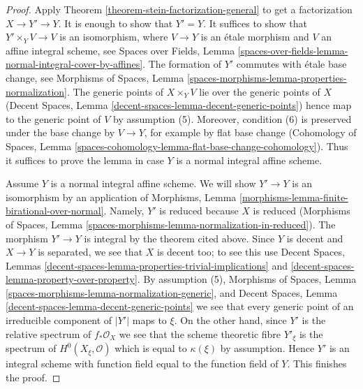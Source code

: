 \documentclass[10pt,a4paper]{amsart}
\theoremstyle{plain}
\theoremstyle{definition}
\theoremstyle{remark}
\numberwithin{equation}{subsection}
\begin{document}
\begin{proof}
Apply Theorem \ref{theorem-stein-factorization-general} to get a
factorization $X \to Y' \to Y$. It is enough to show that $Y' = Y$.
It suffices to show that $Y' \times_Y V \to V$ is an isomorphism,
where $V \to Y$ is an \'etale morphism and $V$ an affine integral scheme,
see Spaces over Fields, Lemma
\ref{spaces-over-fields-lemma-normal-integral-cover-by-affines}.
The formation of $Y'$ commutes with \'etale base change, see
Morphisms of Spaces, Lemma
\ref{spaces-morphisms-lemma-properties-normalization}.
The generic points of $X \times_Y V$ lie over the generic points of $X$
(Decent Spaces, Lemma \ref{decent-spaces-lemma-decent-generic-points})
hence map to the generic point of $V$ by assumption (5). Moreover, condition
(6) is preserved under the base change by $V \to Y$, for example by
flat base change (Cohomology of Spaces, Lemma
\ref{spaces-cohomology-lemma-flat-base-change-cohomology}).
Thus it suffices to prove the lemma in case $Y$ is a normal
integral affine scheme.

\medskip\noindent
Assume $Y$ is a normal integral affine scheme. We will show $Y' \to Y$
is an isomorphism by an application of Morphisms, Lemma
\ref{morphisms-lemma-finite-birational-over-normal}.
Namely, $Y'$ is reduced because $X$ is reduced (Morphisms of Spaces, Lemma
\ref{spaces-morphisms-lemma-normalization-in-reduced}).
The morphism $Y' \to Y$ is integral by the theorem cited above.
Since $Y$ is decent and $X \to Y$ is separated, we see that
$X$ is decent too; to see this use
Decent Spaces, Lemmas
\ref{decent-spaces-lemma-properties-trivial-implications} and
\ref{decent-spaces-lemma-property-over-property}. By assumption (5),
Morphisms of Spaces, Lemma \ref{spaces-morphisms-lemma-normalization-generic},
and Decent Spaces, Lemma \ref{decent-spaces-lemma-decent-generic-points}
we see that every generic point of an irreducible component of $|Y'|$
maps to $\xi$. On the other hand, since $Y'$ is the relative
spectrum of $f_*\mathcal{O}_X$ we see that the scheme theoretic fibre
$Y'_\xi$ is the spectrum of $H^0(X_\xi, \mathcal{O})$ which is
equal to $\kappa(\xi)$ by assumption. Hence $Y'$ is an integral
scheme with function field equal to the function field of $Y$.
This finishes the proof.
\end{proof}
\end{document}
